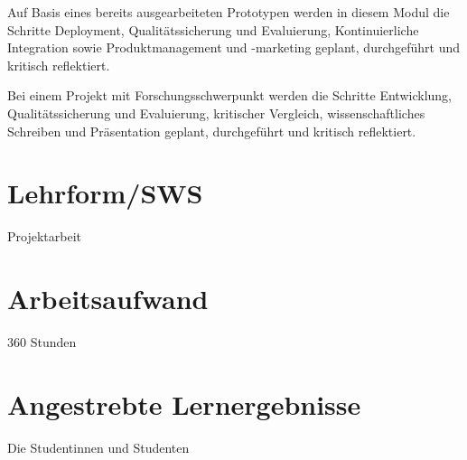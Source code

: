 Auf Basis eines bereits ausgearbeiteten Prototypen werden in diesem
Modul die Schritte Deployment, Qualitätssicherung und Evaluierung,
Kontinuierliche Integration sowie Produktmanagement und -marketing
geplant, durchgeführt und kritisch reflektiert.

Bei einem Projekt mit Forschungsschwerpunkt werden die Schritte
Entwicklung, Qualitätssicherung und Evaluierung, kritischer Vergleich,
wissenschaftliches Schreiben und Präsentation geplant, durchgeführt und
kritisch reflektiert.

\section*{Lehrform/SWS\label{/mi-2017/modulbeschreibungen-master/MA_Modul_Projekt_Verwertung}}\label{lehrformswspathlabelmi-2017modulbeschreibungen-mastermaux5fmodulux5fprojektux5fverwertung}

Projektarbeit

\section*{Arbeitsaufwand\label{/mi-2017/modulbeschreibungen-master/MA_Modul_Projekt_Verwertung}}\label{arbeitsaufwandpathlabelmi-2017modulbeschreibungen-mastermaux5fmodulux5fprojektux5fverwertung}

360 Stunden

\section*{Angestrebte
Lernergebnisse\label{/mi-2017/modulbeschreibungen-master/MA_Modul_Projekt_Verwertung}}\label{angestrebte-lernergebnissepathlabelmi-2017modulbeschreibungen-mastermaux5fmodulux5fprojektux5fverwertung}

Die Studentinnen und Studenten

